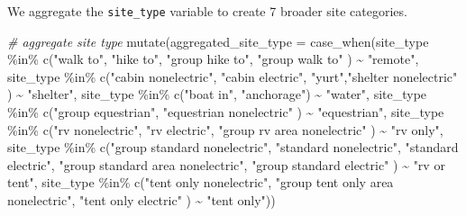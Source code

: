 \documentclass[
  11 pt,
  openany]{book}
\newenvironment{Shaded}{\begin{snugshade}}{\end{snugshade}}
\newcommand{\AttributeTok}[1]{\textcolor[rgb]{0.77,0.63,0.00}{#1}}
\newcommand{\CommentTok}[1]{\textcolor[rgb]{0.56,0.35,0.01}{\textit{#1}}}
\newcommand{\FunctionTok}[1]{\textcolor[rgb]{0.00,0.00,0.00}{#1}}
\newcommand{\NormalTok}[1]{#1}
\newcommand{\SpecialCharTok}[1]{\textcolor[rgb]{0.00,0.00,0.00}{#1}}
\newcommand{\StringTok}[1]{\textcolor[rgb]{0.31,0.60,0.02}{#1}}
\begin{document}
We aggregate the \texttt{site\_type} variable to create 7 broader site categories.

\begin{Shaded}
\begin{Highlighting}[]
\CommentTok{\# aggregate site type}
\FunctionTok{mutate}\NormalTok{(}\AttributeTok{aggregated\_site\_type =} 
         \FunctionTok{case\_when}\NormalTok{(site\_type }\SpecialCharTok{\%in\%} \FunctionTok{c}\NormalTok{(}\StringTok{"walk to"}\NormalTok{, }\StringTok{"hike to"}\NormalTok{, }
                                    \StringTok{"group hike to"}\NormalTok{, }\StringTok{"group walk to"}
\NormalTok{         ) }\SpecialCharTok{\textasciitilde{}} \StringTok{"remote"}\NormalTok{,}
\NormalTok{         site\_type }\SpecialCharTok{\%in\%} \FunctionTok{c}\NormalTok{(}\StringTok{"cabin nonelectric"}\NormalTok{, }\StringTok{"cabin electric"}\NormalTok{, }
                          \StringTok{"yurt"}\NormalTok{,}\StringTok{"shelter nonelectric"}
\NormalTok{         ) }\SpecialCharTok{\textasciitilde{}} \StringTok{"shelter"}\NormalTok{,}
\NormalTok{         site\_type }\SpecialCharTok{\%in\%} \FunctionTok{c}\NormalTok{(}\StringTok{"boat in"}\NormalTok{, }\StringTok{"anchorage"}\NormalTok{) }\SpecialCharTok{\textasciitilde{}} \StringTok{"water"}\NormalTok{,}
\NormalTok{         site\_type }\SpecialCharTok{\%in\%} \FunctionTok{c}\NormalTok{(}\StringTok{"group equestrian"}\NormalTok{, }
                          \StringTok{"equestrian nonelectric"}
\NormalTok{         ) }\SpecialCharTok{\textasciitilde{}} \StringTok{"equestrian"}\NormalTok{,}
\NormalTok{         site\_type }\SpecialCharTok{\%in\%} \FunctionTok{c}\NormalTok{(}\StringTok{"rv nonelectric"}\NormalTok{, }\StringTok{"rv electric"}\NormalTok{, }
                          \StringTok{"group rv area nonelectric"}
\NormalTok{         ) }\SpecialCharTok{\textasciitilde{}} \StringTok{"rv only"}\NormalTok{,}
\NormalTok{         site\_type }\SpecialCharTok{\%in\%} \FunctionTok{c}\NormalTok{(}\StringTok{"group standard nonelectric"}\NormalTok{, }
                          \StringTok{"standard nonelectric"}\NormalTok{,}
                          \StringTok{"standard electric"}\NormalTok{, }
                          \StringTok{"group standard area nonelectric"}\NormalTok{,}
                          \StringTok{"group standard electric"}
\NormalTok{         ) }\SpecialCharTok{\textasciitilde{}} \StringTok{"rv or tent"}\NormalTok{,}
\NormalTok{         site\_type }\SpecialCharTok{\%in\%} \FunctionTok{c}\NormalTok{(}\StringTok{"tent only nonelectric"}\NormalTok{, }
                          \StringTok{"group tent only area nonelectric"}\NormalTok{,}
                          \StringTok{"tent only electric"}
\NormalTok{         ) }\SpecialCharTok{\textasciitilde{}} \StringTok{"tent only"}\NormalTok{))}
\end{Highlighting}
\end{Shaded}
\end{document}
